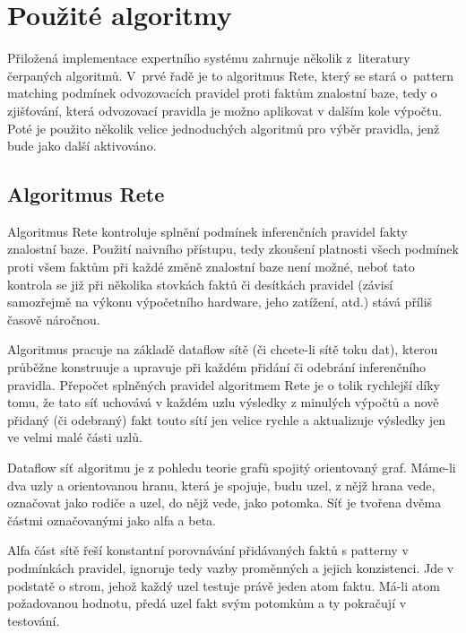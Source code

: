 \section{Použité algoritmy}
Přiložená implementace expertního systému zahrnuje několik z~literatury
čerpaných algoritmů. V~prvé řadě je to algoritmus Rete, který se stará o~pattern
matching podmínek odvozovacích pravidel proti faktům znalostní baze, tedy o
zjišťování, která odvozovací pravidla je možno aplikovat v dalším kole výpočtu.
Poté je použito několik velice jednoduchých algoritmů pro výběr pravidla, jenž
bude jako další aktivováno.

\subsection{Algoritmus Rete}
Algoritmus Rete kontroluje splnění podmínek inferenčních pravidel fakty
znalostní baze. Použití naivního přístupu, tedy zkoušení platnosti všech
podmínek proti všem faktům při každé změně znalostní baze není možné, neboť
tato kontrola se již při několika stovkách faktů či desítkách pravidel
(závisí samozřejmě na výkonu výpočetního hardware, jeho zatížení, atd.)
stává příliš časově náročnou.

Algoritmus pracuje na základě dataflow sítě (či chcete-li sítě toku dat),
kterou průběžne konstruuje a upravuje při každém přidání či odebrání
inferenčního pravidla. Přepočet splněných pravidel algoritmem Rete je o tolik
rychlejší díky tomu, že tato síť uchovává v každém uzlu výsledky z minulých
výpočtů a nově přidaný (či odebraný) fakt touto sítí jen velice rychle
 a aktualizuje výsledky jen ve velmi malé části uzlů.

Dataflow síť algoritmu je z pohledu teorie grafů spojitý orientovaný graf.
Máme-li dva uzly a orientovanou hranu, která je spojuje, budu uzel, z nějž
hrana vede, označovat jako rodiče a uzel, do nějž vede, jako potomka.
Síť je tvořena dvěma částmi označovanými jako alfa a beta.

Alfa část sítě řeší konstantní porovnávání přidávaných faktů s patterny
v podmínkách pravidel, ignoruje tedy vazby proměnných a jejich konzistenci.
Jde v podstatě o strom, jehož každý uzel testuje právě jeden atom faktu.
Má-li atom požadovanou hodnotu, předá uzel fakt svým potomkům a ty pokračují
v testování.
